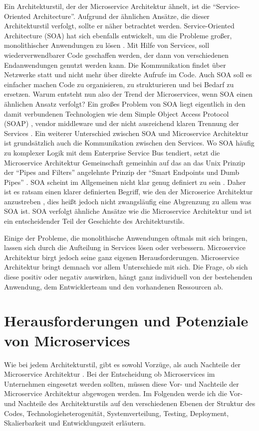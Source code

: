Ein Architekturstil, der der Microservice Architektur ähnelt, ist die \enquote{Service-Oriented Architecture}. Aufgrund der ähnlichen Ansätze, die dieser Architekturstil verfolgt, sollte er näher betrachtet werden.
Service-Oriented Architecture (SOA) hat sich ebenfalls entwickelt, um die Probleme großer, monolithischer Anwendungen zu lösen \cite[][Seite 8]{newman2015building}. Mit Hilfe von Services, soll wiederverwendbarer Code geschaffen werden, der dann von verschiedenen Endanwendungen genutzt werden kann. Die Kommunikation findet über Netzwerke statt und nicht mehr über direkte Aufrufe im Code. Auch SOA soll es einfacher machen Code zu organisieren, zu strukturieren und bei Bedarf zu ersetzen. Warum entsteht nun also der Trend der Microservices, wenn SOA einen ähnlichen Ansatz verfolgt? Ein großes Problem von SOA liegt eigentlich in den damit verbundenen Technologien wie dem Simple Object Access Protocol (SOAP) \cite{soap}, vendor middleware und der nicht ausreichend klaren Trennung der Services \cite[][Seite 8]{newman2015building}.
Ein weiterer Unterschied zwischen SOA und Microservice Architektur ist grundsätzlich auch die Kommunikation zwischen den Services. Wo SOA häufig zu komplexer Logik mit dem Enterprise Service Bus \cite[][]{esb} tendiert, setzt die Microservice Architektur Gemeinschaft gemeinhin auf das an das Unix Prinzip der \enquote{Pipes and Filters} \cite[vgl.][]{microsoft:pipes} angelehnte Prinzip der \enquote{Smart Endpoints und Dumb Pipes} \cite[vgl.][]{Fowler:Intro}.
SOA scheint im Allgemeinen nicht klar genug definiert zu sein \cite[vgl.][]{Fowler:Intro}. Daher ist es ratsam einen klarer definierten Begriff, wie den der Microserice Architektur anzustreben \cite[][]{Fowler:Intro}, dies heißt jedoch nicht zwangsläufig eine Abgrenzung zu allem was SOA ist. SOA verfolgt ähnliche Ansätze wie die Microservice Architektur und ist ein entscheidender Teil der Geschichte des Architekturstils.

Einige der Probleme, die monolithische Anwendungen oftmals mit sich bringen, lassen sich durch die Aufteilung in Services lösen oder verbessern. Microservice Architektur birgt jedoch seine ganz eigenen Herausforderungen. Microservice Architektur bringt demnach vor allem Unterschiede mit sich. Die Frage, ob sich diese positiv oder negativ auswirken, hängt ganz individuell von der bestehenden Anwendung, dem Entwicklerteam und den vorhandenen Ressourcen ab.

\section{Herausforderungen und Potenziale von Microservices}
Wie bei jedem Architekturstil, gibt es sowohl Vorzüge, als auch Nachteile der Microservice Architektur \cite[vgl.][]{Fowler:Guide}.
Bei der Entscheidung ob Microservices im Unternehmen eingesetzt werden sollten, müssen diese Vor- und Nachteile der Microservice Architektur abgewogen werden.
Im Folgenden werde ich die Vor- und Nachteile des Architekturstils auf den verschiedenen Ebenen der Struktur des Codes, Technologieheterogenität, Systemverteilung, Testing, Deployment, Skalierbarkeit und Entwicklungszeit erläutern.


